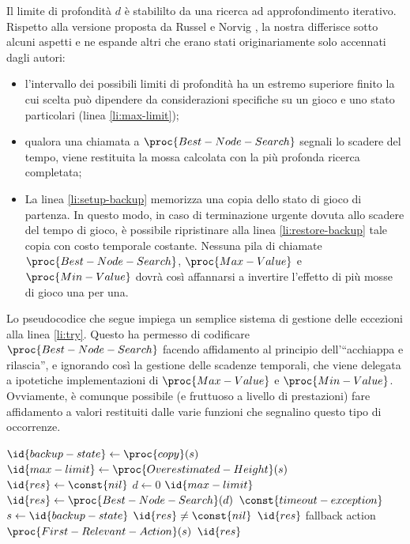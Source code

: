 \documentclass{article}
\begin{document}
Il limite di profondità $d$ è stabililto da una ricerca ad approfondimento
iterativo. Rispetto alla versione proposta da Russel e Norvig
\cite{at.UBO029034619980101.109--111}, la nostra differisce sotto alcuni aspetti
e ne espande altri che erano stati originariamente solo accennati dagli autori:
\begin{itemize}
    \item l'intervallo dei possibili limiti di profondità ha un estremo
      superiore finito la cui scelta può dipendere da considerazioni specifiche
      su un gioco e uno stato particolari (linea \ref{li:max-limit});
    \item qualora una chiamata a $\proc{Best-Node-Search}$ segnali lo scadere
      del tempo, viene restituita la mossa calcolata con la più profonda ricerca
      completata;
    \item La linea \ref{li:setup-backup} memorizza una copia dello stato di
      gioco di partenza. In questo modo, in caso di terminazione urgente dovuta
      allo scadere del tempo di gioco, è possibile ripristinare alla linea
      \ref{li:restore-backup} tale copia con costo temporale costante. Nessuna
      pila di chiamate $\proc{Best-Node-Search}$, $\proc{Max-Value}$ e
      $\proc{Min-Value}$ dovrà così affannarsi a invertire l'effetto di più
      mosse di gioco una per una.
\end{itemize}
\begin{sloppypar}
Lo pseudocodice che segue impiega un semplice sistema di gestione delle
eccezioni alla linea \ref{li:try}. Questo ha permesso di codificare
$\proc{Best-Node-Search}$ facendo affidamento al principio dell'``acchiappa e
rilascia'', e ignorando così la gestione delle scadenze temporali, che viene
delegata a ipotetiche implementazioni di $\proc{Max-Value}$ e
$\proc{Min-Value}$. Ovviamente, è comunque possibile (e fruttuoso a livello di
prestazioni) fare affidamento a valori restituiti dalle varie funzioni che
segnalino questo tipo di occorrenze.
\end{sloppypar}

\begin{codebox}
  \li  $\id{backup-state} \gets \proc{copy}(s)$ \label{li:setup-backup}
  \li  $\id{max-limit} \gets \proc{Overestimated-Height}(s)$
       \label{li:max-limit}
  \li  $\id{res} \gets \const{nil}$
  \li  \For $d \gets 0$ \To $\id{max-limit}$
  \li    \Do
            \label{li:try}
  \li        \Do
               $\id{res} \gets \proc{Best-Node-Search}(d)$
             \End
  \li      {} $\const{timeout-exception}$
  \li        \Do
               $s \gets \id{backup-state}$ \label{li:restore-backup}
  \li          \If $\id{res} \neq \const{nil}$
  \li            \Then
                   \Return $\id{res}$
                 \End
  \li          \Comment fallback action
  \li          \Return $\proc{First-Relevant-Action}(s)$
             \End
         \End
  \li  \Return $\id{res}$
\end{codebox}
\end{document}
